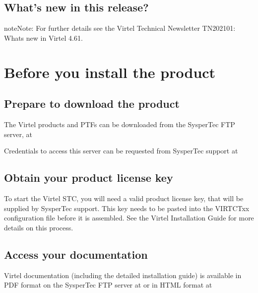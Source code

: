 \documentclass[letterpaper,10pt,english]{sphinxmanual}
\begin{document}
\section{What’s new in this release?}
\label{\detokenize{Getting_Started:what-s-new-in-this-release}}
\begin{sphinxadmonition}{note}{Note:}
For further details see the Virtel Technical Newsletter TN202101: Whats new in Virtel 4.61.
\end{sphinxadmonition}


\chapter{Before you install the product}
\label{\detokenize{Getting_Started:before-you-install-the-product}}

\section{Prepare to download the product}
\label{\detokenize{Getting_Started:prepare-to-download-the-product}}
The Virtel products and PTFs can be downloaded from the SysperTec FTP server, at 

Credentials to access this server can be requested from SysperTec support at 


\section{Obtain your product license key}
\label{\detokenize{Getting_Started:obtain-your-product-license-key}}
To start the Virtel STC, you will need a valid product license key, that will be supplied by SysperTec support. This key needs to be pasted into the VIRTCTxx configuration file before it is assembled. See the Virtel Installation Guide for more details on this process.


\section{Access your documentation}
\label{\detokenize{Getting_Started:access-your-documentation}}
Virtel documentation (including the detailed installation guide) is available in PDF format on the SysperTec FTP server at  or in HTML format at 
\end{document}
